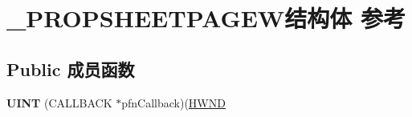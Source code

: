 \hypertarget{struct___p_r_o_p_s_h_e_e_t_p_a_g_e_w}{}\section{\+\_\+\+P\+R\+O\+P\+S\+H\+E\+E\+T\+P\+A\+G\+E\+W结构体 参考}
\label{struct___p_r_o_p_s_h_e_e_t_p_a_g_e_w}
\subsection*{Public 成员函数}
\begin{DoxyCompactItemize}
\item 
\mbox{\label{struct___p_r_o_p_s_h_e_e_t_p_a_g_e_w_aafd7822a72885eb82a8e1ea34e51af15}} 
{\bfseries U\+I\+NT} (C\+A\+L\+L\+B\+A\+CK $\ast$pfn\+Callback)(\hyperlink{interfacevoid}{H\+W\+ND}
\end{DoxyCompactItemize}
